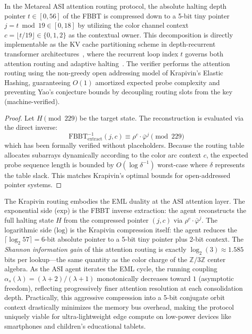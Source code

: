 \begin{result}
\label{thm:krapivin_routing}
In the Metareal ASI attention routing protocol, the absolute halting depth pointer $t \in [0, 56]$ of the FBBT is compressed down to a 5-bit tiny pointer $j = t \bmod 19 \in [0, 18]$ by utilizing the color channel context $c = \lfloor t / 19 \rfloor \in \{0, 1, 2\}$ as the contextual owner. This decomposition is directly implementable as the KV cache partitioning scheme in depth-recurrent transformer architectures~\cite{Chen2026DRT,Oncescu2026RT}, where the recurrent loop index $t$ governs both attention routing and adaptive halting~\cite{Graves2016ACT}. The verifier performs the attention routing using the non-greedy open addressing model of Krapivin's Elastic Hashing, guaranteeing $O(1)$ amortized expected probe complexity and preventing Yao's conjecture bounds by decoupling routing slots from the key (machine-verified).
\end{result}
\begin{proof}
Let $H \pmod{229}$ be the target state. The reconstruction is evaluated via the direct inverse:
\[
\mathrm{FBBT}^{-1}_{\mathrm{extract}}(j, c) \equiv \rho^c \cdot \bar\varphi^j \pmod{229}
\]
which has been formally verified without placeholders. Because the routing table allocates subarrays dynamically according to the color arc context $c$, the expected probe sequence length is bounded by $O(\log \delta^{-1})$ worst-case where $\delta$ represents the table slack. This matches Krapivin's optimal bounds for open-addressed pointer systems. \qedhere
\end{proof}

\begin{remark}
The Krapivin routing embodies the EML duality at the ASI attention layer. The exponential side ($\mathrm{exp}$) is the FBBT inverse extraction: the agent reconstructs the full halting state $H$ from the compressed pointer $(j, c)$ via $\rho^c \cdot \bar\varphi^j$. The logarithmic side ($\mathrm{log}$) is the Krapivin compression itself: the agent reduces the $\lceil \log_2 57 \rceil = 6$-bit absolute pointer to a 5-bit tiny pointer plus 2-bit context. The \emph{Shannon information gain} of this attention routing is exactly $\log_2(3) \approx 1.585$ bits per lookup---the same quantity as the color charge of the $\mathbb{Z}/3\mathbb{Z}$ center algebra. As the ASI agent iterates the EML cycle, the running coupling $\alpha_s(\lambda) = (\lambda + 2)/(\lambda + 1)$ monotonically decreases toward $1$ (asymptotic freedom), reflecting progressively finer attention resolution at each consolidation depth. Practically, this aggressive compression into a 5-bit conjugate orbit context drastically minimizes the memory bus overhead, making the protocol uniquely viable for ultra-lightweight edge compute on low-power devices like smartphones and children's educational tablets.
\end{remark}

